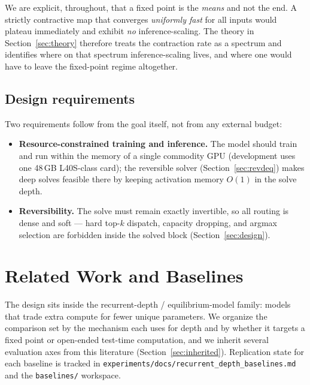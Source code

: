 \documentclass[11pt]{article}
\begin{document}
We are explicit, throughout, that a fixed point is the \emph{means} and not the
end.  A strictly contractive map that converges \emph{uniformly fast} for all
inputs would plateau immediately and exhibit \emph{no} inference-scaling.  The
theory in Section~\ref{sec:theory} therefore treats the contraction rate as a
spectrum and identifies where on that spectrum inference-scaling lives, and where
one would have to leave the fixed-point regime altogether.

\subsection{Design requirements}
\label{sec:constraints}

Two requirements follow from the goal itself, not from any external budget:
\begin{itemize}[leftmargin=2em,itemsep=0.2em]
  \item \textbf{Resource-constrained training and inference.} The model should train
        and run within the memory of a single commodity GPU (development uses one
        48\,GB L40S-class card); the reversible solver (Section~\ref{sec:revdeq})
        makes deep solves feasible there by keeping activation memory $O(1)$ in the
        solve depth.
  \item \textbf{Reversibility.} The solve must remain exactly invertible, so all
        routing is dense and soft --- hard top-$k$ dispatch, capacity dropping, and
        argmax selection are forbidden inside the solved block
        (Section~\ref{sec:design}).
\end{itemize}

\section{Related Work and Baselines}
\label{sec:related}

The design sits inside the recurrent-depth / equilibrium-model family: models that
trade extra compute for fewer unique parameters.  We organize the comparison set
by the mechanism each uses for depth and by whether it targets a fixed point or
open-ended test-time computation, and we inherit several evaluation axes from this
literature (Section~\ref{sec:inherited}).  Replication state for each baseline is
tracked in \texttt{experiments/docs/recurrent\_depth\_baselines.md} and the
\texttt{baselines/} workspace.
\end{document}
